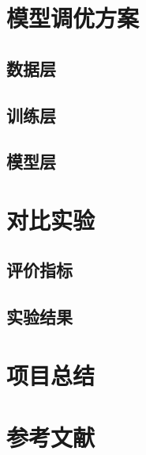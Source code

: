 \documentclass[letterpaper]{article}
\begin{document}
\section{模型调优方案}
  \subsection{数据层}
  \subsection{训练层}
  \subsection{模型层}

\section{对比实验}
  \subsection{评价指标}
  \subsection{实验结果}

\section{项目总结}

\section{参考文献}
\end{document}
